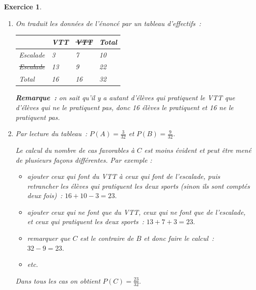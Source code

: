 \documentclass[10pt]{article}
\newtheorem{exo}{Exercice}
\begin{document}
\begin{exo}


\begin{enumerate}
\item

On traduit les données de l'énoncé par un tableau d'effectifs~:

\begin{center}
 \begin{tabular}{|m{2cm}|m{2cm}|m{2cm}|m{2cm}|}\hline
& VTT &\st{VTT}& Total \\ \hline 
Escalade& 3& 7&10 \\ \hline
\st{Escalade}& 13& 9& 22\\ \hline
Total& 16& 16& 32\\ \hline
\end{tabular}
\end{center}

\medskip

\textbf{Remarque~:} on sait qu'il y a autant  d'élèves qui pratiquent le VTT que d'élèves qui ne le pratiquent pas, donc 16 élèves le pratiquent et 16 ne le pratiquent pas.

\item Par lecture du tableau~: $P(A)=\frac{3}{32}$ et $P(B)=\frac{9}{32}.$

\medskip

Le calcul du nombre de cas favorables à $C$ est moins évident et peut être mené de plusieurs façons différentes. Par exemple :

\begin{itemize}
\item[\textbullet] ajouter ceux qui font du VTT à ceux qui font de l'escalade, puis retrancher les élèves qui pratiquent les deux sports (sinon ils sont comptés deux fois)~: $16+10-3=23.$
\item[\textbullet] ajouter ceux qui ne font que du VTT, ceux qui ne font que de l'escalade, et ceux qui pratiquent les deux sports~: $13+7+3=23.$
\item[\textbullet] remarquer que $C$ est le contraire de $B$ et donc faire le calcul~: $32-9=23.$
\item[\textbullet] etc.
\end{itemize}

Dans tous les cas on obtient $P(C)=\frac{23}{32}.$

\end{enumerate}

\end{exo}
\end{document}
